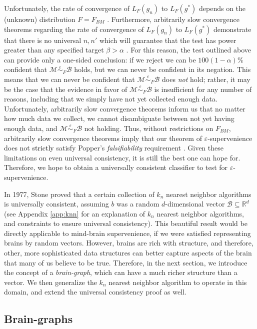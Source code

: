 \documentclass{article}
\newcommand{\mB}{\mathcal{B}}
\newcommand{\mM}{\mathcal{M}}
\newcommand{\Real}{\mathbb{R}}           %
\newcommand{\eps}{\varepsilon}
\providecommand{\mc}[1]{\mathcal{#1}}
\newcommand{\MeB}{\mM \overset{\varepsilon}{{\sim}}_F \mB}
\providecommand{\tr}[1]{\textcolor{black}{#1}}
\begin{document}
Unfortunately, the rate of convergence of $L_{F}(g_n)$ to $L_{F}(g^*)$ depends on the (unknown) distribution $F=F_{BM}$ \cite{DGL96}. Furthermore, arbitrarily slow convergence theorems regarding the rate of convergence of $L_{F}(g_n)$ to $L_{F}(g^*)$ demonstrate that there is no universal $n,n'$ which will guarantee that the test has power greater than any specified target $\beta > \alpha$ \cite{Devroye83}. For this reason, the test outlined above can provide only a one-sided conclusion: if we reject we can be $100(1-\alpha)$\% confident that $\MeB$ holds, but we can never be confident in its negation.  This means that we can never be confident that $\MeB$ does \emph{not} hold; rather, it may be the case that the evidence in favor of $\MeB$ is insufficient for any number of reasons, including that we simply have not yet collected enough data. Unfortunately, arbitrarily slow convergence theorems inform us that no matter how much data we collect, we cannot disambiguate between not yet having enough data, and $\MeB$ not holding.  Thus, without restrictions on $F_{BM}$, arbitrarily slow convergence theorems imply that our theorem of $\varepsilon$-supervenience does not \tr{strictly} satisfy Popper's {\it falsifiability} requirement \cite{Popper}. Given these limitations on even universal consistency, it is still the best one can hope for.  Therefore, we hope to obtain a universally consistent classifier to test for $\eps$-supervenience.

In 1977, Stone proved that a certain collection of $k_n$ nearest neighbor algorithms is universally consistent, assuming $b$ was a random $d$-dimensional vector $\mc{B} \subseteq \Real^d$ \cite{Stone77} (see Appendix \ref{app:knn} for an explanation of $k_n$ nearest neighbor algorithms, and constraints to ensure universal consistency).  This beautiful result would be directly applicable to mind-brain supervenience, if we were satisfied representing brains by random vectors.  However, brains are rich with structure, and therefore, other, more sophisticated data structures can better capture aspects of the brain that many of us believe to be true. Therefore, in the next section, we introduce the concept of a \emph{brain-graph}, which can have a much richer structure than a vector.  We then generalize the $k_n$ nearest neighbor algorithm to operate in this domain, and extend the universal consistency proof as well.




\subsection{Brain-graphs} %
\label{sub:brain_graphs}
\end{document}
